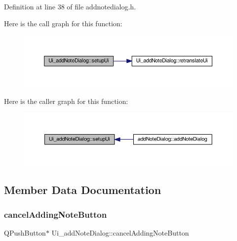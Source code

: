 Definition at line 38 of file addnotedialog.\+h.

Here is the call graph for this function\+:
\nopagebreak
\begin{figure}[H]
\begin{center}
\leavevmode
\includegraphics[width=350pt]{classUi__addNoteDialog_a2487f1cd1542da959f06b7412e80ef0b_cgraph}
\end{center}
\end{figure}
Here is the caller graph for this function\+:
\nopagebreak
\begin{figure}[H]
\begin{center}
\leavevmode
\includegraphics[width=350pt]{classUi__addNoteDialog_a2487f1cd1542da959f06b7412e80ef0b_icgraph}
\end{center}
\end{figure}


\subsection{Member Data Documentation}
\hypertarget{classUi__addNoteDialog_a600ac0c5310ee52416b8fa3ff1e1142e}{}\label{classUi__addNoteDialog_a600ac0c5310ee52416b8fa3ff1e1142e} 
\subsubsection{\texorpdfstring{cancel\+Adding\+Note\+Button}{cancelAddingNoteButton}}
{\footnotesize\ttfamily Q\+Push\+Button$\ast$ Ui\+\_\+add\+Note\+Dialog\+::cancel\+Adding\+Note\+Button}



